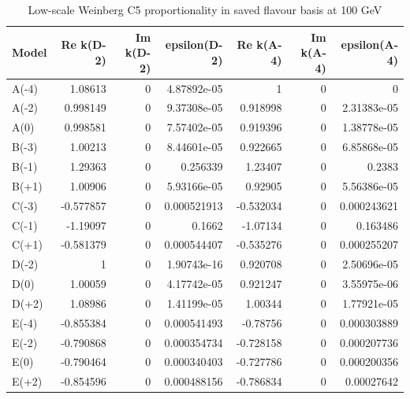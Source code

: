 \begin{table}[htbp]
\centering
\small
\caption{Low-scale Weinberg C5 proportionality in saved flavour basis at 100 GeV}
\label{tab:table_C4_Weinberg_proportionality}
\begin{tabular}{lrrrrrr}
\hline
Model & Re k(D-2) & Im k(D-2) & epsilon(D-2) & Re k(A-4) & Im k(A-4) & epsilon(A-4) \\
\hline
A(-4) & 1.08613 & 0 & 4.87892e-05 & 1 & 0 & 0 \\
A(-2) & 0.998149 & 0 & 9.37308e-05 & 0.918998 & 0 & 2.31383e-05 \\
A(0) & 0.998581 & 0 & 7.57402e-05 & 0.919396 & 0 & 1.38778e-05 \\
B(-3) & 1.00213 & 0 & 8.44601e-05 & 0.922665 & 0 & 6.85868e-05 \\
B(-1) & 1.29363 & 0 & 0.256339 & 1.23407 & 0 & 0.2383 \\
B(+1) & 1.00906 & 0 & 5.93166e-05 & 0.92905 & 0 & 5.56386e-05 \\
C(-3) & -0.577857 & 0 & 0.000521913 & -0.532034 & 0 & 0.000243621 \\
C(-1) & -1.19097 & 0 & 0.1662 & -1.07134 & 0 & 0.163486 \\
C(+1) & -0.581379 & 0 & 0.000544407 & -0.535276 & 0 & 0.000255207 \\
D(-2) & 1 & 0 & 1.90743e-16 & 0.920708 & 0 & 2.50696e-05 \\
D(0) & 1.00059 & 0 & 4.17742e-05 & 0.921247 & 0 & 3.55975e-06 \\
D(+2) & 1.08986 & 0 & 1.41199e-05 & 1.00344 & 0 & 1.77921e-05 \\
E(-4) & -0.855384 & 0 & 0.000541493 & -0.78756 & 0 & 0.000303889 \\
E(-2) & -0.790868 & 0 & 0.000354734 & -0.728158 & 0 & 0.000207736 \\
E(0) & -0.790464 & 0 & 0.000340403 & -0.727786 & 0 & 0.000200356 \\
E(+2) & -0.854596 & 0 & 0.000488156 & -0.786834 & 0 & 0.00027642 \\
\hline
\end{tabular}
\end{table}
